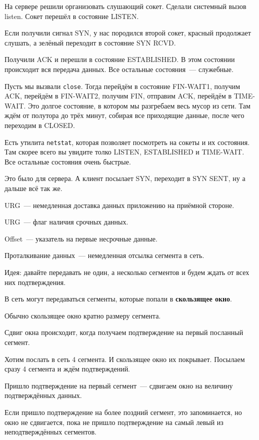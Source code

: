 На сервере решили организовать слушающий сокет. Сделали системный вызов listen. Сокет перешёл в состояние LISTEN.

Если получили сигнал SYN, у нас породился второй сокет, красный продолжает слушать, а зелёный переходит в состояние SYN RCVD.

Получили ACK и перешли в состояние ESTABLISHED. В этом состоянии происходит вся передача данных. Все остальные состояния~--- служебные.

Пусть мы вызвали {\tt close}. Тогда перейдём в состояние FIN-WAIT1, получим ACK, перейдём в FIN-WAIT2, получим FIN, отправим ACK, перейдём в TIME-WAIT. Это долгое состояние, в котором мы разгребаем весь мусор из сети. Там ждём от полутора до трёх минут, собирая все приходящие данные, после чего переходим в CLOSED.

Есть утилита {\tt netstat}, которая позволяет посмотреть на сокеты и их состояния. Там скорее всего вы увидите толко LISTEN, ESTABLISHED и TIME-WAIT. Все остальные состояния очень быстрые.

Это было для сервера. А клиент посылает SYN, переходит в SYN SENT, ну а дальше всё так же.


URG~--- немедленная доставка данных приложению на приёмной стороне.

URG~--- флаг наличия срочных данных.

Offset~--- указатель на первые несрочные данные.

Проталкивание данных~--- немедленная отсылка сегмента в сеть. 


Идея: давайте передавать не один, а несколько сегментов и будем ждать от всех них подтверждения.

В сеть могут передаваться сегменты, которые попали в {\bf скользящее окно}.

Обычно скользящее окно кратно размеру сегмента.

Сдвиг окна происходит, когда получаем подтверждение на первый посланный сегмент.

Хотим послать в сеть 4 сегмента. И скользящее окно их покрывает. Посылаем сразу 4 сегмента и ждём подтверждений. 

Пришло подтверждение на первый сегмент~--- сдвигаем окно на величину подтверждённых данных.

Если пришло подтверждение на более поздний сегмент, это запоминается, но окно не сдвигается, пока не пришло подтверждение на самый левый из неподтверждённых сегментов.

